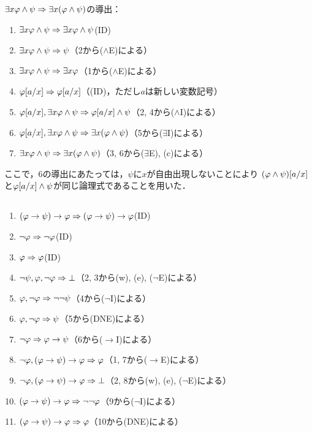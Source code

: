 \(\exists x \varphi \land \psi \sequent \exists x \paren{\varphi \land \psi}\)の導出：
\begin{enumerate}
	\item \(\exists x \varphi \land \psi \Rightarrow \exists x \varphi \land \psi\)\quad (ID)
	\item \(\exists x \varphi \land \psi \Rightarrow \psi\)\quad （2から(\(\land\)E)による）
	\item \(\exists x \varphi \land \psi \Rightarrow \exists x \varphi\)\quad （1から(\(\land\)E)による）
	\item \(\subst{\varphi}{a/x} \sequent \subst{\varphi}{a/x}\)\quad （(ID)，ただし\(a\)は新しい変数記号）
	\item \(\subst{\varphi}{a/x}, \exists x \varphi \land \psi \sequent \subst{\varphi}{a/x} \land \psi\)\quad （2, 4から(\(\land\)I)による）
	\item \(\subst{\varphi}{a/x}, \exists x \varphi \land \psi \sequent \exists x \paren{\varphi \land \psi}\)\quad （5から(\(\exists\)I)による）
	\item \(\exists x \varphi \land \psi \sequent \exists x \paren{\varphi \land \psi}\)\quad （3, 6から(\(\exists\)E), (c)による）
\end{enumerate}
ここで，6の導出にあたっては，\(\psi\)に\(x\)が自由出現しないことにより
\(\subst{\paren{\varphi \land \psi}}{a/x}\)と\(\subst{\varphi}{a/x} \land \psi\)が同じ論理式であることを用いた．


\subsection*{}

\begin{enumerate}
	\item \(\paren{\varphi \to \psi} \to \varphi \sequent \paren{\varphi \to \psi} \to \varphi\)\quad (ID)
	\item \(\lnot \varphi \Rightarrow \lnot \varphi\)\quad (ID)
	\item \(\varphi \Rightarrow \varphi\)\quad (ID)
	\item \(\lnot \psi, \varphi, \lnot \varphi \Rightarrow \bot\)\quad （2, 3から(w), (e), (\(\lnot\)E)による）
	\item \(\varphi, \lnot \varphi \Rightarrow \lnot \lnot \psi\)\quad （4から(\(\lnot\)I)による）
	\item \(\varphi, \lnot \varphi \Rightarrow \psi\)\quad （5から(DNE)による）
	\item \(\lnot \varphi \Rightarrow \varphi \to \psi\)\quad （6から(\(\to\)I)による）
	\item \(\lnot \varphi, \paren{\varphi \to \psi} \to \varphi \sequent \varphi\)\quad （1, 7から(\(\to\)E)による）
	\item \(\lnot \varphi, \paren{\varphi \to \psi} \to \varphi \sequent \bot\)\quad （2, 8から(w), (e), (\(\lnot\)E)による）
	\item \(\paren{\varphi \to \psi} \to \varphi \sequent \lnot \lnot \varphi\)\quad （9から(\(\lnot\)I)による）
	\item \(\paren{\varphi \to \psi} \to \varphi \sequent \varphi\)\quad （10から(DNE)による）
\end{enumerate}

